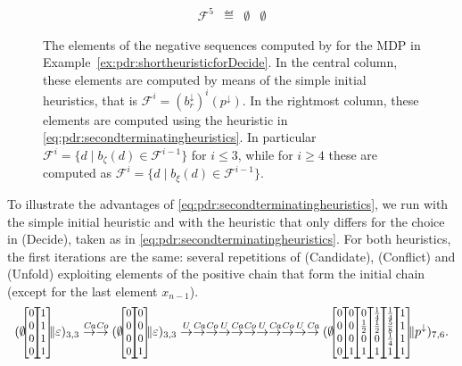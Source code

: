 \begin{example}
\begin{figure}[t]
\[\begin{array}{rc|c|c}
			\mathcal{F}^5 & \eqdef & \emptyset                                                                                                                                                                                                                                                                                                & \emptyset
		\end{array}
		\]
		\caption{The elements of the negative sequences computed by {\ADPDR} for the MDP in Example~\ref{ex:pdr:shortheuristicforDecide}. In the central column, these elements are computed by means of the simple initial heuristics, that is $\mathcal{F}^i=(b_r^\downarrow)^i(p^\downarrow)$. In the rightmost column, these elements are computed using the heuristic in \eqref{eq:pdr:secondterminatingheuristics}. In particular $\mathcal{F}^i = \{d\mid b_\zeta(d) \in \mathcal{F}^{i-1} \}$ for $i\leq 3$, while for $i\geq 4$ these are computed as $\mathcal{F}^i = \{d\mid b_\xi(d) \in \mathcal{F}^{i-1} \}$.}
		\label{fig:pdr:exDecideheuristics}
	\end{figure}

	To illustrate the advantages of \eqref{eq:pdr:secondterminatingheuristics}, we run {\ADPDR} with the simple initial heuristic and with the heuristic that only differs for the choice in (Decide), taken as in \eqref{eq:pdr:secondterminatingheuristics}. For both heuristics, the first iterations are the same: several repetitions of (Candidate), (Conflict) and (Unfold) exploiting elements of the positive chain that form the initial chain (except for the last element $x_{n-1}$).
		{\footnotesize
			\begin{align*}
				(\emptyset\cvec{0}{0}{0}{0}\cvec{1}{1}{1}{1} \| \varepsilon)_{3,3}
				\tr{\mathit{Ca}} %
				\tr{\mathit{Co}} (\emptyset\cvec{0}{0}{0}{0}\cvec{0}{0}{0}{1} \| \varepsilon)_{3,3}
				\tr{U}\tr{\mathit{Ca}} %
				\tr{\mathit{Co}} %
				\tr{U}\tr{\mathit{Ca}} %
				\tr{\mathit{Co}} %
				\tr{U}\tr{\mathit{Ca}}  %
				\tr{\mathit{Co}} %
				\tr{U}\tr{\mathit{Ca}}  (\emptyset\cvec{0}{0}{0}{0}\cvec{0}{0}{0}{1} \cvec{0}{\frac{1}{2}}{0}{1}\cvec{\frac{1}{4}}{\frac{1}{2}}{0}{1} \cvec{\frac{1}{4}}{\frac{5}{8}}{\frac{1}{4}}{1} \cvec{1}{1}{1}{1} \|  p^\downarrow )_{7,6} \textrm{.}
			\end{align*}
		}


\end{example}
